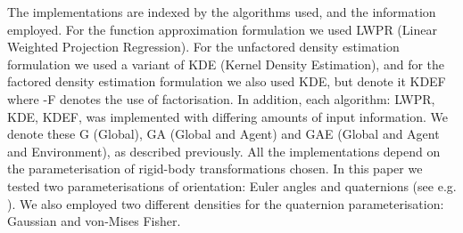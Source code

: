 %
%
The implementations are indexed by the algorithms used, and the information employed. For the function approximation formulation we used LWPR (Linear Weighted Projection Regression). For the unfactored density estimation formulation we used a variant of KDE (Kernel Density Estimation), and for the factored density estimation formulation we also used KDE, but denote it KDEF where -F denotes the use of factorisation. In addition, each algorithm: LWPR, KDE, KDEF, was implemented with differing amounts of input information. We denote these G (Global), GA (Global and Agent) and GAE (Global and Agent and Environment), as described previously. All the implementations depend on the parameterisation of rigid-body transformations chosen. In this paper we tested two parameterisations of orientation: Euler angles and quaternions (see e.g. \cite{murray_mathematical_1994}). We also employed two different densities for the quaternion parameterisation: Gaussian and von-Mises Fisher.


